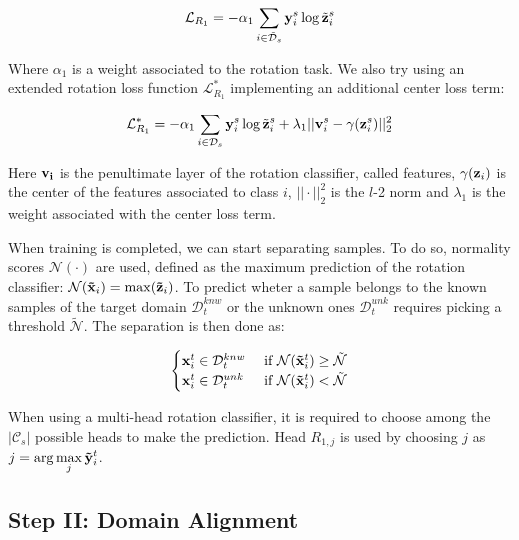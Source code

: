 \documentclass[10pt,twocolumn,letterpaper]{article}
\begin{document}
\begin{equation}
  \mathcal{L}_{R_1} = -\alpha_1\sum_{i\in\mathcal{\tilde{D}}_s} {\bf y}_i^s \log \tilde{{\bf z}}_i^s
  \label{eq:baseloss_rot}
\end{equation}

Where $\alpha_1$ is a weight associated to the rotation task.
We also try using an extended rotation loss function $\mathcal{L}_{R_1}^*$ implementing an additional center loss\cite{CenterLoss} term:

\begin{equation}
  \mathcal{L}_{R_1}^* = -\alpha_1\sum_{i\in\mathcal{D}_s} {\bf y}_i^s \log \tilde{{\bf z}}_i^s+\lambda_1||{\bf v}_i^s-\gamma({\bf z}_i^s)||_2^2
  \label{eq:center_loss}
\end{equation}

Here ${\bf v_i}$ is the penultimate layer of the rotation classifier,
called features, 
$\gamma({\bf z}_i)$ is the center of the features associated to class $i$,
$||\cdot||_2^2$ is the $l$-2 norm and $\lambda_1$ is the weight associated with the center loss term.

When training is completed, 
we can start separating samples.
To do so,
normality scores $\mathcal{N}(\cdot)$ are used,
defined as the maximum prediction of the rotation classifier:
$\mathcal{N}({\bf\tilde{x}}_i) = \max({\bf\tilde{z}}_i)$.
To predict wheter a sample belongs to the known samples of the target domain $\mathcal{D}_t^{knw}$ or the unknown ones $\mathcal{D}_t^{unk}$ requires picking a threshold $\tilde{\mathcal{N}}$.
The separation is then done as:

\begin{equation}
  \begin{cases}
    {\bf x}_i^t \in \mathcal{D}_t^{knw} & \text{ if } \mathcal{N}({\bf\tilde x}_i^t) \geq \tilde{\mathcal{N}} \\
    {\bf x}_i^t \in \mathcal{D}_t^{unk} & \text{ if } \mathcal{N}({\bf\tilde x}_i^t) < \tilde{\mathcal{N}}
  \end{cases}
  \label{eq:sample_separation}
\end{equation}

When using a multi-head rotation classifier, 
it is required to choose among the $|\mathcal{C}_s|$ possible heads to make the prediction.
Head $R_{1,j}$ is used by choosing $j$ as $\displaystyle j = \arg\max_j {\bf\tilde{y}}_i^t$.

\subsection{Step II: Domain Alignment}
\label{sec:domain_alignment}
\end{document}
